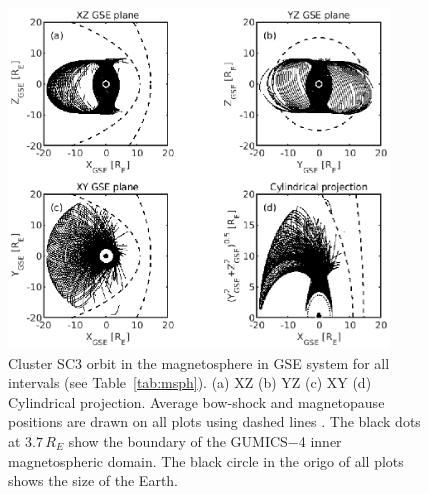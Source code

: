 \documentclass[draft]{agujournal2019}
\begin{document}
\begin{figure}[h]
\centering
\includegraphics[width=0.9\textwidth,angle=0]{swe-2021SW002807-f11} 
\caption{Cluster SC3 orbit in the magnetosphere in GSE system for all intervals (see Table~\ref{tab:msph}). (a) XZ (b) YZ (c) XY (d) Cylindrical projection. Average bow-shock and magnetopause positions are drawn on all plots using dashed lines \cite[respectively]{peredo95:_three_alfven_mach,tsyganenko95:_model_earth}. The black dots at $3.7\,R_E$ show the boundary of the GUMICS$-$4 inner magnetospheric domain. The black circle in the origo of all plots shows the size of the Earth.}
\label{fig:msphorbit}
\end{figure}

\pagebreak
\end{document}
